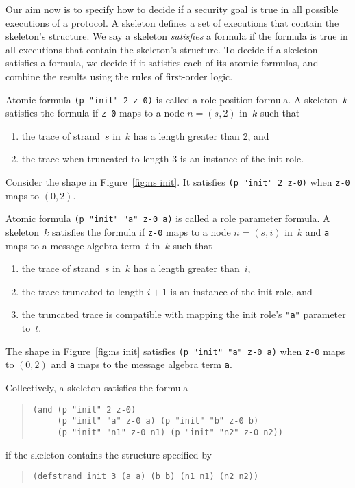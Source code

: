 \documentclass[12pt]{article}
\begin{document}
Our aim now is to specify how to decide if a security goal is true in
all possible executions of a protocol.  A skeleton defines a set of
executions that contain the skeleton's structure.  We say a skeleton
\emph{satisfies} a formula if the formula is true in all executions
that contain the skeleton's structure.  To decide if a skeleton
satisfies a formula, we decide if it satisfies each of its atomic
formulas, and combine the results using the rules of first-order
logic.

Atomic formula \texttt{(p "init" 2 z-0)} is called a role position
formula.  A skeleton~$k$ satisfies the formula if \texttt{z-0} maps to
a node $n=(s,2)$ in~$k$ such that
\begin{enumerate}
\item the trace of strand~$s$ in~$k$ has a length greater than 2, and
\item the trace when truncated to length 3 is an instance of the init
  role.
\end{enumerate}
Consider the shape in Figure~\ref{fig:ns
  init}.  It satisfies \texttt{(p "init" 2 z-0)} when \texttt{z-0}
maps to $(0,2)$.

Atomic formula \texttt{(p "init" "a" z-0 a)} is called a role
parameter formula.  A skeleton~$k$ satisfies the formula if
\texttt{z-0} maps to a node $n=(s,i)$ in~$k$ and \texttt{a} maps to a
message algebra term~$t$ in~$k$ such that
\begin{enumerate}
\item the trace of strand~$s$ in~$k$ has a length greater than~$i$,
\item the trace truncated to length $i+1$ is an instance of the
  init role, and
\item the truncated trace is compatible with mapping the init role's
  \texttt{"a"} parameter to~$t$.
\end{enumerate}
The shape in Figure~\ref{fig:ns init} satisfies \texttt{(p "init" "a"
  z-0 a)} when \texttt{z-0} maps to $(0,2)$ and \texttt{a} maps to the
message algebra term \texttt{a}.

Collectively, a skeleton satisfies the formula
\begin{quote}
\begin{verbatim}
(and (p "init" 2 z-0)
     (p "init" "a" z-0 a) (p "init" "b" z-0 b)
     (p "init" "n1" z-0 n1) (p "init" "n2" z-0 n2))
\end{verbatim}
\end{quote}
if the skeleton contains the structure specified by
\begin{quote}
\begin{verbatim}
(defstrand init 3 (a a) (b b) (n1 n1) (n2 n2))
\end{verbatim}
\end{quote}
\end{document}

